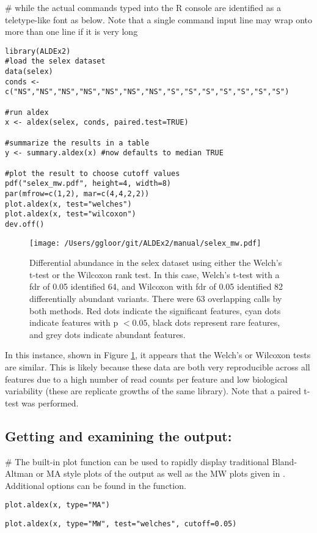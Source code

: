 \documentclass[11pt]{article}
\begin{document}
\noindent \# while the actual commands typed into the R console are identified as a teletype-like font as below. Note that a single command input line may wrap onto more than one line if it is very long\\

\begin{verbatim}
library(ALDEx2)
#load the selex dataset
data(selex)
conds <- c("NS","NS","NS","NS","NS","NS","NS","S","S","S","S","S","S","S")

#run aldex
x <- aldex(selex, conds, paired.test=TRUE)

#summarize the results in a table
y <- summary.aldex(x) #now defaults to median TRUE

#plot the result to choose cutoff values
pdf("selex_mw.pdf", height=4, width=8)
par(mfrow=c(1,2), mar=c(4,4,2,2))
plot.aldex(x, test="welches")
plot.aldex(x, test="wilcoxon")
dev.off()
\end{verbatim}
\begin{figure}[!h]
\begin{center}
\texttt{[image: /Users/ggloor/git/ALDEx2/manual/selex\_mw.pdf]}
\caption{Differential abundance in the selex dataset using either the Welch's t-test or the Wilcoxon rank test. In this case, Welch's t-test with a fdr of 0.05 identified 64, and Wilcoxon with fdr of 0.05 identified 82 differentially abundant variants. There were 63 overlapping calls by both methods. Red dots indicate the significant features, cyan dots indicate features with p $<0.05$, black dots represent rare features, and grey dots indicate abundant features. }
\label{selex}
\end{center}
\end{figure}

\vspace{12pt}
In this instance,  shown in Figure \ref{selex}, it appears that the Welch's or Wilcoxon tests  are similar. This is likely because these data are both very reproducible across all features due to a high number of read counts per feature and low biological variability (these are replicate growths of the same library). Note that a paired t-test was performed.

\subsection{Getting and examining the output:}
\noindent\#  The built-in plot function can be used to rapidly display traditional Bland-Altman or MA style plots of the output as well as the MW plots given in \cite{fernandes:2013}. Additional options can be found in the function.\\
\noindent\begin{verbatim}plot.aldex(x, type="MA")\end{verbatim}
\noindent\begin{verbatim}plot.aldex(x, type="MW", test="welches", cutoff=0.05)\end{verbatim}
\end{document}
